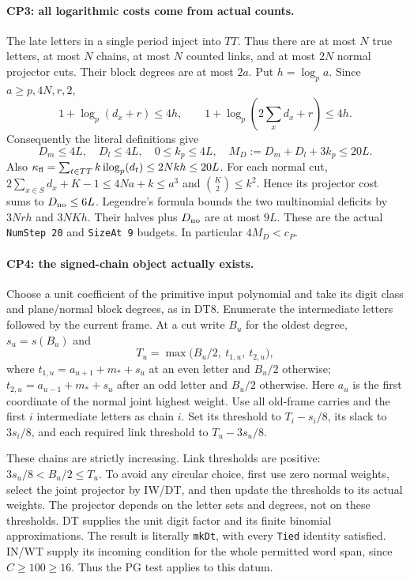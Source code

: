 \documentclass[11pt,a4paper]{article}
\numberwithin{equation}{section}
\theoremstyle{remark}\newtheorem{remark}[theorem]{Remark}
\begin{document}
\paragraph{CP3: all logarithmic costs come from actual counts.}
The late letters in a single period inject into $TT$. Thus there are
at most $N$ true letters, at most $N$ chains, at most $N$ counted
links, and at most $2N$ normal projector cuts. Their block degrees are
at most $2a$. Put $h=\log_p a$. Since $a\ge p,4N,r,2$,
\[
 1+\log_p(d_x+r)\le4h,\qquad
 1+\log_p(2\sum_xd_x+r)\le4h.
\]
Consequently the literal definitions give
\[
 D_m\le4L,\quad D_l\le4L,\quad
 0\le k_p\le4L,\quad M_D:=D_m+D_l+3k_p\le20L.         \tag{CP.5}
\]
Also $\kappa_{\rm fl}=\sum_{t\in TT}k\operatorname{ilog}_p(d_t)
\le2Nkh\le20L$.
For each normal cut,
$2\sum_{x\in S}d_x+K-1\le4Na+k\le a^3$ and
$\binom K2\le k^2$. Hence its projector cost sums to $D_{\rm no}\le6L$.
Legendre's formula bounds the two multinomial deficits by
$3Nrh$ and $3NKh$. Their halves plus $D_{\rm no}$ are at most $9L$.
These are the actual \texttt{NumStep 20} and \texttt{SizeAt 9}
budgets. In particular $4M_D<c_P$.

\paragraph{CP4: the signed-chain object actually exists.}
Choose a unit coefficient of the primitive input polynomial and take
its digit class and plane/normal block degrees, as in DT8. Enumerate
the intermediate letters followed by the current frame. At a cut
write $B_u$ for the oldest degree, $s_u=s(B_u)$ and
\[
 T_u=\max\bigl(B_u/2,\ t_{1,u},\ t_{2,u}\bigr),
\]
where $t_{1,u}=a_{u+1}+m_*+s_u$ at an even letter and $B_u/2$
otherwise; $t_{2,u}=a_{u-1}+m_*+s_u$ after an odd letter and $B_u/2$
otherwise. Here $a_u$ is the first coordinate of the normal joint
highest weight. Use all old-frame carries and the first $i$
intermediate letters as chain $i$. Set its threshold to
$T_i-s_i/8$, its slack to $3s_i/8$, and each required link threshold
to $T_u-3s_u/8$.

These chains are strictly increasing. Link thresholds are positive:
$3s_u/8<B_u/2\le T_u$. To avoid any circular choice, first use zero
normal weights, select the joint projector by IW/DT, and then update
the thresholds to its actual weights. The projector depends on the
letter sets and degrees, not on these thresholds. DT supplies the
unit digit factor and its finite binomial approximations. The result
is literally \texttt{mkDt}, with every \texttt{Tied} identity satisfied.
IN/WT supply its incoming condition for the whole permitted word
span, since $C\ge100\ge16$. Thus the PG test applies to this datum.
\end{document}
